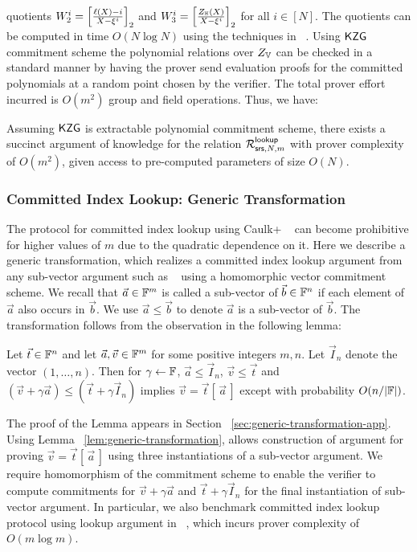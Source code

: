 quotients $W_2^i=\left[{\frac{\ell(X) - i}{X-\xi^i}}\right]_2$ and $W_3^i=\left[{\frac{Z_\mathbb{H}(X)}{X-\xi^i}}\right]_2$ for all $i\in [N]$.
The quotients can be computed in time $O(N\log N)$ using the techniques in ~\cite{EPRINT:FeiKho23}. Using $\mathsf{KZG}$ commitment
scheme the polynomial relations over $Z_{\mathbb{V}}$ can be checked in a standard manner
by having the prover send evaluation proofs for the committed polynomials at a random point chosen by the verifier.
The total prover effort incurred is $O(m^2)$ group and field operations.
Thus, we have:
\begin{lemma}\label{lem:comm-index-lookup}
Assuming $\mathsf{KZG}$ is extractable polynomial commitment scheme, there exists a succinct argument of knowledge for
the relation $\mathcal{R}^{\mathsf{lookup}}_{\mathsf{srs},N,m}$ with prover complexity of $O(m^2)$, given access to pre-computed parameters of size $O(N)$.
\end{lemma}

\subsubsection{Committed Index Lookup: Generic Transformation}\label{subsubsec:generic-transformation}
The protocol for committed index lookup using Caulk+ ~\cite{EPRINT:PosKat22} can become prohibitive for higher values of
$m$ due to the quadratic dependence on it. Here we describe a generic transformation, which realizes a committed index lookup
argument from any sub-vector argument such as ~\cite{CCS:ZBKMNS22,EPRINT:PosKat22,EPRINT:ZGKMR22,EPRINT:EagFioGab22} using a homomorphic
vector commitment scheme. We recall that $\vec{a}\in \mathbb{F}^m$ is called a sub-vector of $\vec{b}\in \mathbb{F}^n$ if each element of $\vec{a}$
also occurs in $\vec{b}$. We use $\vec{a}\leq \vec{b}$ to denote $\vec{a}$ is a sub-vector of $\vec{b}$.
The transformation follows from the observation in the following lemma:
\begin{lemma}\label{lem:generic-transformation}
Let $\vec{t}\in \mathbb{F}^n$ and let $\vec{a},\vec{v}\in \mathbb{F}^m$ for some positive integers $m,n$. Let $\vec{I}_n$ denote the vector $(1,\ldots,n)$.
Then for $\gamma\gets \mathbb{F}$, $\vec{a}\leq \vec{I}_n$, $\vec{v}\leq \vec{t}$ and $(\vec{v}+\gamma \vec{a})\leq (\vec{t} + \gamma \vec{I}_n)$ implies
$\vec{v}=\vec{t}[\,\vec{a}\,]$ except with probability $O(n/|\mathbb{F}|)$.
\end{lemma}
The proof of the Lemma appears in Section ~\ref{sec:generic-transformation-app}.
Using Lemma ~\ref{lem:generic-transformation}, allows construction of argument for proving $\vec{v}=\vec{t}[\,\vec{a}\,]$ using three instantiations
of a sub-vector argument. We require homomorphism of the commitment scheme to enable the verifier to compute commitments for $\vec{v}+\gamma \vec{a}$ and
$\vec{t} + \gamma \vec{I}_n$ for the final instantiation of sub-vector argument. In particular, we also benchmark committed index lookup
protocol using lookup argument in ~\cite{EPRINT:EagFioGab22}, which incurs prover complexity of $O(m\log m)$.
~

